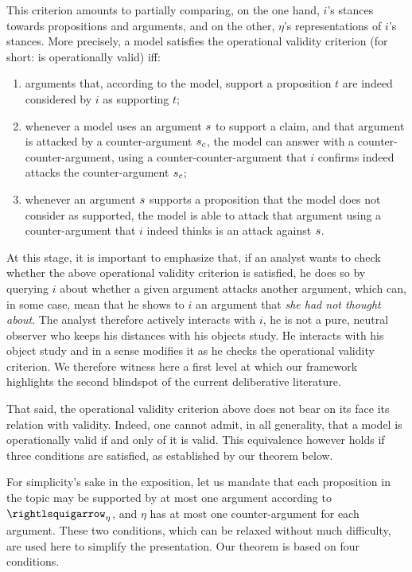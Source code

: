 \documentclass[version=3.21, pagesize, twoside=off, bibliography=totoc, DIV=calc, fontsize=12pt, a4paper, french, english]{scrartcl}
\begin{document}
This criterion amounts to partially comparing, on the one hand, $i$'s stances towards propositions and arguments, and on the other, $\eta$'s representations of $i$’s stances. 
More precisely, a model satisfies the operational validity criterion (for short: is operationally valid) iff:
\begin{enumerate}[label=({\roman*}), ref={\roman*}]
	\item arguments that, according to the model, support a proposition $t$ are indeed considered by $i$ as supporting $t$;
	\item whenever a model uses an argument $s$ to support a claim, and that argument is attacked by a counter-argument $s_c$, the model can answer with a counter-counter-argument, using a counter-counter-argument that $i$ confirms indeed attacks the counter-argument $s_c$;
	\item whenever an argument $s$ supports a proposition that the model does not consider as supported, the model is able to attack that argument using a counter-argument that $i$ indeed thinks is an attack against $s$.
\end{enumerate}

At this stage, it is important to emphasize that, if an analyst wants to check whether the above operational validity criterion is satisfied, he does so by querying $i$ about whether a given argument attacks another argument, which can, in some case, mean that he shows to $i$ an argument that \emph{she had not thought about}. 
The analyst therefore actively interacts with $i$, he is not a pure, neutral observer who keeps his distances with his objects study. 
He interacts with his object study and in a sense modifies it as he checks the operational validity criterion. 
We therefore witness here a first level at which our framework highlights the second blindspot of the current deliberative literature.

That said, the operational validity criterion above does not bear on its face its relation with validity. 
Indeed, one cannot admit, in all generality, that a model is operationally valid if and only of it is valid. 
This equivalence however holds if three conditions are satisfied, as established by our theorem below.

For simplicity's sake in the exposition, let us mandate that each proposition in the topic may be supported by at most one argument according to $\mleadsto$, and $\eta$ has at most one counter-argument for each argument. 
These two conditions, which can be relaxed without much difficulty, are used here to simplify the presentation. 
Our theorem is based on four conditions.
\end{document}
